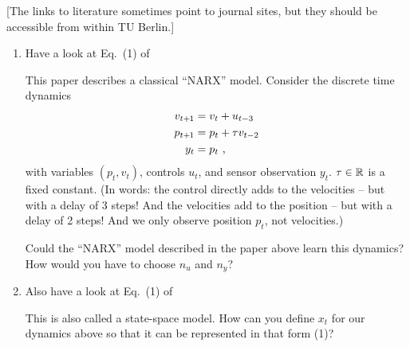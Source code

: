 

\renewcommand{\course}{Robot Learning}
\renewcommand{\coursepicture}{roblearn.png}
\renewcommand{\coursedate}{Summer 2024}
\renewcommand{\exnum}{Weekly Exercise 2}

\renewcommand{\teacher}{Marc Toussaint \& Wolfgang H{\"o}nig}
\renewcommand{\addressTUB}{
  Learning~\&~Intelligent~Systems Lab, Intelligent Multi-Robot Coordination Lab, TU~Berlin\\\small
  Marchstr. 23, 10587 Berlin, Germany
}

\exercises




\exercisestitle



[The links to literature sometimes point to journal sites, but they should be accessible from within TU Berlin.]

\begin{enumerate}
\item Have a look at Eq.\ (1) of


This paper describes a classical ``NARX'' model. Consider the discrete time dynamics
\begin{align}
v_{t{{\hspace*{-.0pt}\text{\rm +}\hspace*{-.5pt}}1}} &= v_t + u_{t-3} \\
p_{t{{\hspace*{-.0pt}\text{\rm +}\hspace*{-.5pt}}1}} &= p_t + \tau v_{t-2} \\
y_t &= p_t ~,
\end{align}
with variables $(p_t, v_t)$, controls $u_t$, and sensor observation $y_t$. $\tau\in{\mathbb{R}}$ is a fixed constant. (In words: the control directly adds to the velocities -- but with a delay of 3 steps! And the velocities add to the position -- but with a delay of 2 steps! And we only observe position $p_t$, not velocities.)

Could the ``NARX'' model described in the paper above learn this dynamics? How would you have to choose $n_u$ and $n_y$?


\item Also have a look at Eq.\ (1) of


This is also called a state-space model. How can you define $x_t$ for our dynamics above so that it can be represented in that form (1)?







\end{enumerate}

